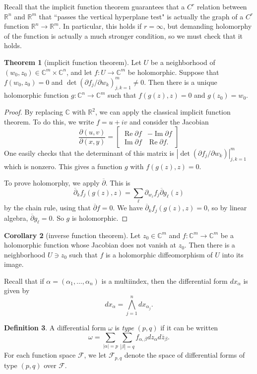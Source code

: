 \documentclass[12pt]{report}
\newcommand{\RR}{\mathbb{R}}
\newcommand{\CC}{\mathbb{C}}
\newcommand{\dbar}{\overline \partial}
\renewcommand{\Re}{\operatorname{Re}}
\renewcommand{\Im}{\operatorname{Im}}
\newcommand{\dfn}[1]{\emph{#1}\index{#1}}
\theoremstyle{definition}
\newtheorem{theorem}{Theorem}[chapter]
\newtheorem{corollary}[theorem]{Corollary}
\newtheorem{definition}[theorem]{Definition}
\begin{document}
Recall that the implicit function theorem guarantees that a $C^r$ relation between $\RR^n$ and $\RR^m$ that ``passes the vertical hyperplane test" is actually the graph of a $C^r$ function $\RR^n \to \RR^m$. In particular, this holds if $r = \infty$, but demanding holomorphy of the function is actually a much stronger condition, so we must check that it holds.
\begin{theorem}[implicit function theorem]
    Let $U$ be a neighborhood of $(w_0, z_0) \in \CC^m \times \CC^n$, and let $f: U \to \CC^m$ be holomorphic. Suppose that $f(w_0, z_0) = 0$ and $\det(\partial f_j/\partial w_k)_{j,k=1}^m \neq 0$. Then there is a unique holomorphic function $g: \CC^n \to \CC^m$ such that $f(g(z), z) = 0$ and $g(z_0) = w_0$.
\end{theorem}
\begin{proof}
    By replacing $\CC$ with $\RR^2$, we can apply the classical implicit function theorem. To do this, we write $f = u + iv$ and consider the Jacobian
$$\frac{\partial(u,v)}{\partial(x,y)} = \begin{bmatrix}
    \Re \partial f & -\Im \partial f\\
    \Im \partial f & \Re \partial f.
\end{bmatrix}$$
    One easily checks that the determinant of this matrix is $|\det(\partial f_j/\partial w_k)|_{j,k=1}^m$ which is nonzero. This gives a function $g$ with $f(g(z), z) = 0$.
    
    To prove holomorphy, we apply $\dbar$. This is
$$\dbar_k f_j(g(z), z) = \sum_\ell \partial_{w_\ell} f_j \dbar g_\ell(z)$$
    by the chain rule, using that $\dbar f = 0$. We have $\dbar_k f_j(g(z), z) = 0$, so by linear algebra, $\dbar g_\ell = 0$. So $g$ is holomorphic.
\end{proof}
\begin{corollary}[inverse function theorem]
    Let $z_0 \in \CC^m$ and $f: \CC^m \to \CC^m$ be a  holomorphic function whose Jacobian does not vanish at $z_0$. Then there is a neighborhood $U \ni z_0$ such that $f$ is a holomorphic diffeomorphism of $U$ into its image.
\end{corollary}

    Recall that if $\alpha = (\alpha_1, \dots, \alpha_n)$ is a multiindex, then the differential form $dx_\alpha$ is given by
    $$dx_\alpha = \bigwedge_{j=1}^n dx_{\alpha_j}.$$
\begin{definition}
    A differential form $\omega$ is \dfn{type} $(p, q)$ if it can be written
    $$\omega = \sum_{|\alpha| = p} \sum_{|\beta| = q} f_{\alpha,\beta} dz_\alpha d\overline z_\beta.$$
    For each function space $\mathcal F$, we let $\mathcal F_{p,q}$ denote the space of differential forms of type $(p, q)$ over $\mathcal F$.
\end{definition}
\end{document}
